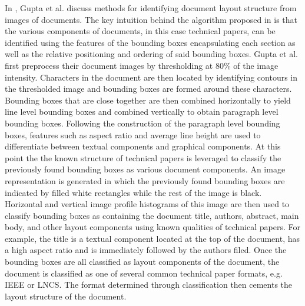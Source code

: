 \documentclass[12pt]{IEEEtran}
\begin{document}
In \cite{3}, Gupta et al. discuss methods for identifying document layout structure from images of documents. The key intuition behind the algorithm proposed in \cite{3} is that the various components of documents, in this case technical papers, can be identified using the features of the bounding boxes encapsulating each section as well as the relative positioning and ordering of said bounding boxes. Gupta et al. first preprocess their document images by thresholding at 80\% of the image intensity. Characters in the document are then located by identifying contours in the thresholded image and bounding boxes are formed around these characters. Bounding boxes that are close together are then combined horizontally to yield line level bounding boxes and combined vertically to obtain paragraph level bounding boxes. Following the construction of the paragraph level bounding boxes, features such as aspect ratio and average line height are used to differentiate between textual components and graphical components. At this point the the known structure of technical papers is leveraged to classify the previously found bounding boxes as various document components. An image representation is generated in which the previously found bounding boxes are indicated by filled white rectangles while the rest of the image is black. Horizontal and vertical image profile histograms of this image are then used to classify bounding boxes as containing the document title, authors, abstract, main body, and other layout components using known qualities of technical papers. For example, the title is a textual component located at the top of the document, has a high aspect ratio and is immediately followed by the authors filed. Once the bounding boxes are all classified as layout components of the document, the document is classified as one of several common technical paper formats, e.g. IEEE or LNCS. The format determined through classification then cements the layout structure of the document.
\end{document}
